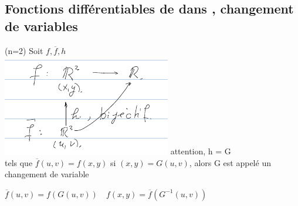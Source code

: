 \documentclass[12pt,a4paper]{article}
\begin{document}
\subsection[$\rn \to \Rm$, Changement de variables]{Fonctions différentiables  de \rn dans \rn, changement de variables}
\begin{boite}
	 (n=2) Soit $f, \overline{f}, h$\\
	\includegraphics[scale=0.75]{images/fonction_diff} attention, h = G\\
	tels que $\overline{f}(u,v) = f(x,y)$ si $(x,y) = G(u,v)$, alors G est appelé un changement de variable
\end{boite}
 $\overline{f}(u,v) = f(G(u,v))\quad f(x,y) = \overline{f}(G^{-1}(u,v))$
\end{document}

